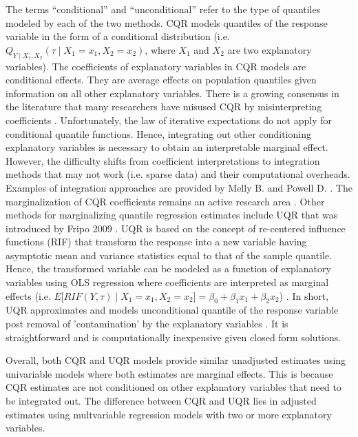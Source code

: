 \documentclass[12pt]{article}
\begin{document}
\begin{appendices}
\indent \indent The terms ``conditional'' and ``unconditional'' refer to the type of quantiles modeled by each of the two methods. CQR models quantiles of the response variable in the form of a conditional distribution (i.e. $Q_{Y \mid X_1, X_2}(\tau \mid X_1=x_1, X_2=x_2)$, where $X_1$ and $X_2$ are two explanatory variables). The coefficients of explanatory variables in CQR models are conditional effects. They are average effects on population quantiles given information on all other explanatory variables. There is a growing consensus in the literature that many researchers have misused CQR by misinterpreting coefficients \cite{killewald2014motherhood}. Unfortunately, the law of iterative expectations do not apply for conditional quantile functions. Hence, integrating out other conditioning explanatory variables is necessary to obtain an interpretable marginal effect. However, the difficulty shifts from coefficient interpretations to integration methods that may not work (i.e. sparse data) and their computational overheads. Examples of integration approaches are provided by Melly B. and Powell D. \cite{powell2016quantile, melly2015changes}. The marginalization of CQR coefficients remains an active research area \cite{angrist2008mostly, gushchin2018integrated}. Other methods for marginalizing quantile regression estimates include UQR that was introduced by Fripo 2009 \cite{firpo2009unconditional}. UQR is based on the concept of re-centered influence functions (RIF) that transform the response into a new variable having asymptotic mean and variance statistics equal to that of the sample quantile. Hence, the transformed variable can be modeled as a function of explanatory variables using OLS regression where coefficients are interpreted as marginal effects (i.e. $E\big[RIF(Y, \tau) \mid X_1=x_1, X_2=x_2 \big] = \beta_0 + \beta_1 x_1 + \beta_2 x_2$) \cite{firpo2009unconditional}. In short, UQR approximates and models unconditional quantile of the response variable post removal of 'contamination' by the explanatory variables \cite{firpo2009unconditional}. It is straightforward and is computationally inexpensive given closed form solutions. 

Overall, both CQR and UQR models provide similar unadjusted estimates using univariable models where both estimates are marginal effects. This is because CQR estimates are not conditioned on other explanatory variables that need to be integrated out. The difference between CQR and UQR lies in adjusted estimates using multvariable regression models with two or more explanatory variables. 


\end{appendices}
\end{document}
